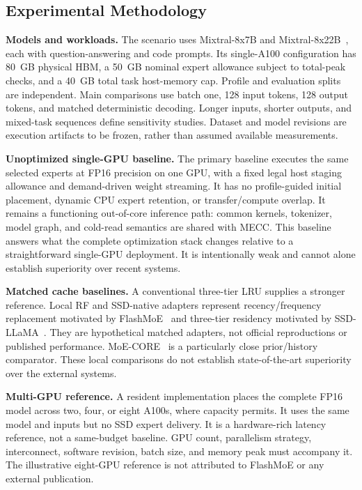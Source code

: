 \documentclass[conference,9pt,letterpaper]{IEEEtran}
\newcommand{\mecc}{\textsc{MECC}}
\begin{document}
\subsection{Experimental Methodology}
\textbf{Models and workloads.} The scenario uses Mixtral-8x7B and Mixtral-8x22B~\cite{mixtral,mixtral22}, each with question-answering and code prompts. Its single-A100 configuration has 80~GB physical HBM, a 50~GB nominal expert allowance subject to total-peak checks, and a 40~GB total task host-memory cap. Profile and evaluation splits are independent. Main comparisons use batch one, 128 input tokens, 128 output tokens, and matched deterministic decoding. Longer inputs, shorter outputs, and mixed-task sequences define sensitivity studies. Dataset and model revisions are execution artifacts to be frozen, rather than assumed available measurements.

\textbf{Unoptimized single-GPU baseline.} The primary baseline executes the same selected experts at FP16 precision on one GPU, with a fixed legal host staging allowance and demand-driven weight streaming. It has no profile-guided initial placement, dynamic CPU expert retention, or transfer/compute overlap. It remains a functioning out-of-core inference path: common kernels, tokenizer, model graph, and cold-read semantics are shared with \mecc{}. This baseline answers what the complete optimization stack changes relative to a straightforward single-GPU deployment. It is intentionally weak and cannot alone establish superiority over recent systems.

\textbf{Matched cache baselines.} A conventional three-tier LRU supplies a stronger reference. Local RF and SSD-native adapters represent recency/frequency replacement motivated by FlashMoE~\cite{flashmoe} and three-tier residency motivated by SSD-LLaMA~\cite{ssdllama}. They are hypothetical matched adapters, not official reproductions or published performance. MoE-CORE~\cite{core} is a particularly close prior/history comparator. These local comparisons do not establish state-of-the-art superiority over the external systems.

\textbf{Multi-GPU reference.} A resident implementation places the complete FP16 model across two, four, or eight A100s, where capacity permits. It uses the same model and inputs but no SSD expert delivery. It is a hardware-rich latency reference, not a same-budget baseline. GPU count, parallelism strategy, interconnect, software revision, batch size, and memory peak must accompany it. The illustrative eight-GPU reference is not attributed to FlashMoE or any external publication.
\end{document}
